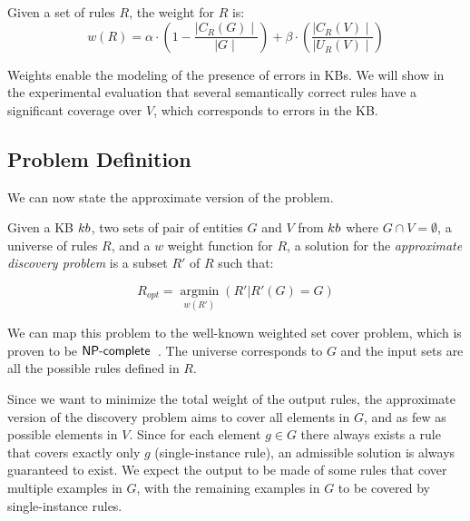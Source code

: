 \begin{definition}
	Given a set of rules $R$, the weight for $R$ is:
	\begin{equation*}
		w(R) = \alpha \cdot (1-\frac{\mid C_{R}(G)\mid}{\mid G \mid}) +\beta \cdot (\frac{\mid C_{R}(V) \mid}{\mid U_{R}(V)\mid})
	\end{equation*}
\end{definition}

Weights enable the modeling  of the presence of errors in KBs. We will show in the experimental evaluation that several semantically correct rules have a significant coverage over $V$, which corresponds to errors in the KB. 


\subsection{Problem Definition} \label{sec:krd_prob_def}
We can now state the approximate version of the problem.

\begin{definition}
	Given a KB ${\sc kb}$, two sets of pair of entities $G$ and $V$ from ${\sc kb}$ where $G \cap V = \emptyset$, a universe of rules $R$, and a $w$ weight function for $R$,
	a solution for the \emph{approximate discovery problem} is a subset $R'$ of $R$  such that:
	
	$$R_{opt}=\underset{w(R')}{\operatorname{argmin}}(R'|R'(G) = G)$$
\end{definition}

We can map this problem to the well-known weighted set cover problem, which is proven to be $\textsf{NP\mbox{-}complete}$~\cite{chvatal1979greedy}. The universe corresponds to $G$ and the input sets are all the possible rules defined in $R$.

Since we want to minimize the total weight of the output rules, the approximate version of the discovery problem aims to cover all elements in $G$, and as few as possible elements in $V$. Since for each element $g \in G$ there always exists a rule that covers exactly only $g$ (single-instance rule), an admissible solution is always guaranteed to exist. We expect the output to be made of some rules that cover multiple examples in $G$, with the remaining examples in $G$ to be covered by single-instance rules. 

